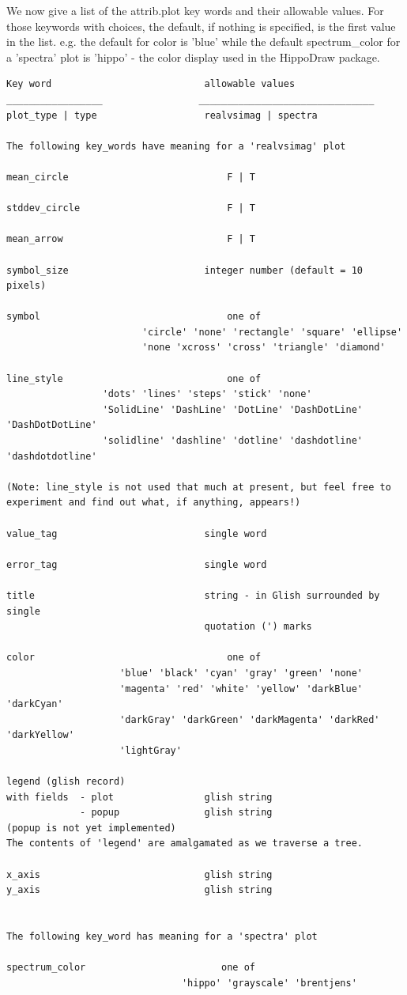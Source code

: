 \documentclass[10pt]{article}
\begin{document}
We now give a list of the attrib.plot key words  and their
allowable values. For those keywords with choices, the default,
if nothing is specified, is the first value in the list.
e.g. the default for color is 'blue' while the default
spectrum\_color for a 'spectra' plot is 'hippo' - the color
display used in the HippoDraw package.


\begin{verbatim}
Key word                           allowable values
_________________                 _______________________________
plot_type | type                   realvsimag | spectra

The following key_words have meaning for a 'realvsimag' plot

mean_circle                            F | T

stddev_circle                          F | T

mean_arrow                             F | T

symbol_size                        integer number (default = 10 pixels)

symbol                                 one of
                        'circle' 'none' 'rectangle' 'square' 'ellipse'
                        'none 'xcross' 'cross' 'triangle' 'diamond'

line_style                             one of
                 'dots' 'lines' 'steps' 'stick' 'none'
                 'SolidLine' 'DashLine' 'DotLine' 'DashDotLine' 'DashDotDotLine'
                 'solidline' 'dashline' 'dotline' 'dashdotline' 'dashdotdotline'

(Note: line_style is not used that much at present, but feel free to
experiment and find out what, if anything, appears!)

value_tag                          single word

error_tag                          single word

title                              string - in Glish surrounded by single
                                   quotation (') marks

color                                  one of
                    'blue' 'black' 'cyan' 'gray' 'green' 'none'
                    'magenta' 'red' 'white' 'yellow' 'darkBlue' 'darkCyan'
                    'darkGray' 'darkGreen' 'darkMagenta' 'darkRed' 'darkYellow'
                    'lightGray'

legend (glish record)
with fields  - plot                glish string
             - popup               glish string
(popup is not yet implemented)
The contents of 'legend' are amalgamated as we traverse a tree.

x_axis                             glish string
y_axis                             glish string


The following key_word has meaning for a 'spectra' plot

spectrum_color                        one of
                               'hippo' 'grayscale' 'brentjens'
\end{verbatim}
\end{document}
